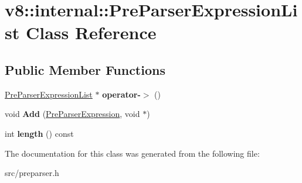 \hypertarget{classv8_1_1internal_1_1_pre_parser_expression_list}{}\section{v8\+:\+:internal\+:\+:Pre\+Parser\+Expression\+List Class Reference}
\label{classv8_1_1internal_1_1_pre_parser_expression_list}
\subsection*{Public Member Functions}
\begin{DoxyCompactItemize}
\item 
\hypertarget{classv8_1_1internal_1_1_pre_parser_expression_list_abacaea78c86160724315a66b90378bfe}{}\hyperlink{classv8_1_1internal_1_1_pre_parser_expression_list}{Pre\+Parser\+Expression\+List} $\ast$ {\bfseries operator-\/$>$} ()\label{classv8_1_1internal_1_1_pre_parser_expression_list_abacaea78c86160724315a66b90378bfe}

\item 
\hypertarget{classv8_1_1internal_1_1_pre_parser_expression_list_a4f36318925fbf00060364b08ee7f0aae}{}void {\bfseries Add} (\hyperlink{classv8_1_1internal_1_1_pre_parser_expression}{Pre\+Parser\+Expression}, void $\ast$)\label{classv8_1_1internal_1_1_pre_parser_expression_list_a4f36318925fbf00060364b08ee7f0aae}

\item 
\hypertarget{classv8_1_1internal_1_1_pre_parser_expression_list_aea5522c7cd8c9382b1546291266fd9be}{}int {\bfseries length} () const \label{classv8_1_1internal_1_1_pre_parser_expression_list_aea5522c7cd8c9382b1546291266fd9be}

\end{DoxyCompactItemize}


The documentation for this class was generated from the following file\+:\begin{DoxyCompactItemize}
\item 
src/preparser.\+h\end{DoxyCompactItemize}
